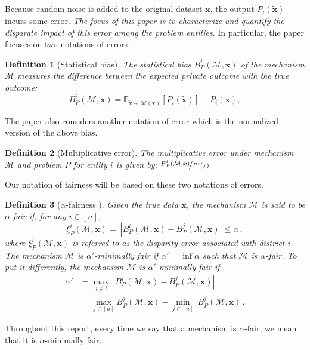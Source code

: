 \documentclass[9pt,twocolumn,twoside,lineno]{pnas-new}
\newtheorem{definition}{Definition}
\newcommand{\cM}{\mathcal{M}}
\newcommand{\EE}{\mathbb{E}} \newcommand{\RR}{\mathbb{R}}
\newcommand{\truedata}{\bm{x}}
\begin{document}
Because random noise is added to the original dataset $\bm{x}$, the output $P_i(\tilde{\bm{x}})$ incurs some error. {\em The focus of this paper is to characterize and quantify the disparate impact of this error among the problem entities}. In particular, the paper focuses on two notations of errors. 

\begin{definition}[Statistical bias]
\label{def:bias}
The statistical bias  $ B_P^i(\cM, \bm{x}) $ of the mechanism $\cM$ measures the difference between the expected private outcome with the true outcome: 
 \begin{equation}
 \label{eq:bias}
  B_P^i(\cM, \bm{x}) = 
  \EE_{\tilde{\bm{x}} \sim \cM(\bm{x})} \left[ P_i(\tilde{\bm{x}}) \right] - P_i (\bm{x}),
   \end{equation}

\end{definition}

The paper also considers another notation of error which is the normalized version of the above bias.
\begin{definition}[Multiplicative error]
The multiplicative error under mechanism $\cM$ and problem $P$ for entity $i$ is given by: $\nicefrac{B_P^i(\cM, \bm{x})}{P^i(x)}$

\end{definition}

Our notation of fairness will be based on these two notations of errors. 


\begin{definition}[$\alpha$-fairness \cite{fioretto2021decision}]
        Given the true data $\truedata$, the mechanism $\cM$ is said to be \emph{$\alpha$-fair} if, for any $i\in[n]$,
        \begin{equation*}
            \xi^{i}_P(\cM, \bm{x}) = ~\left\vert  B_P^i(\cM, \bm{x}) - B_P^j(\cM, \bm{x}) 
             \right\vert\leq \alpha\,,
        \end{equation*}
        where $ \xi^{i}_P(\cM, \bm{x})$ is referred to as the \emph{disparity error} associated with 
        district $i$. The mechanism $\cM$ is \emph{$\alpha'$-minimally fair} if $\alpha'=\inf \alpha$ such that
        $\cM$ is $\alpha$-fair. To put it differently, the mechanism $\cM$ is \emph{$\alpha'$-minimally fair} if 
        \begin{align*}
            \alpha'& = \max_{j\neq i}~\left\vert  B_P^i(\cM, \bm{x}) - B_P^j(\cM, \bm{x}) 
             \right\vert \\
             &= \max_{j\in [n]} B_P^j(\cM, \bm{x})   -\min_{j\in [n]}~  B_P^j(\cM, \bm{x}) \,.
        \end{align*}
    \end{definition}
    Throughout this report, every time we say that a mechanism is $\alpha$-fair, we mean that
    it is $\alpha$-minimally fair.
\end{document}
